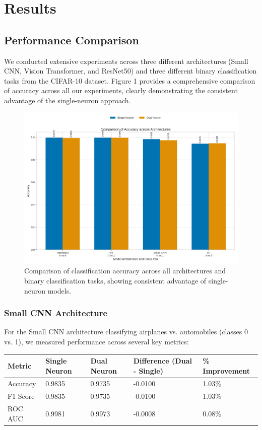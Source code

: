\documentclass[11pt]{article}
\begin{document}


\section{Results}
\subsection{Performance Comparison}
We conducted extensive experiments across three different architectures (Small CNN, Vision Transformer, and ResNet50) and three different binary classification tasks from the CIFAR-10 dataset. Figure 1 provides a comprehensive comparison of accuracy across all our experiments, clearly demonstrating the consistent advantage of the single-neuron approach.

\begin{figure}[htbp]
\centering
\includegraphics[width=\textwidth]{figures/accuracy_comparison.png}
\caption{Comparison of classification accuracy across all architectures and binary classification tasks, showing consistent advantage of single-neuron models.}
\end{figure}

\subsubsection{Small CNN Architecture}
For the Small CNN architecture classifying airplanes vs. automobiles (classes 0 vs. 1), we measured performance across several key metrics:

\begin{tabular}{lllll}
\hline
Metric & Single Neuron & Dual Neuron & Difference (Dual - Single) & \% Improvement \\
\hline
Accuracy & 0.9835 & 0.9735 & -0.0100 & 1.03\% \\
F1 Score & 0.9835 & 0.9735 & -0.0100 & 1.03\% \\
ROC AUC & 0.9981 & 0.9973 & -0.0008 & 0.08\% \\
\hline
\end{tabular}
\end{document}
